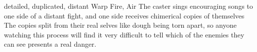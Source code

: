   {detailed, duplicated, distant}%
  {Warp}%
  {Fire, Air}%
  {}%
  {The caster sings encouraging songs to one side of a distant fight, and one side receives chimerical copies of themselves}%
  {The copies split from their real selves like dough being torn apart, so anyone watching this process will find it very difficult to tell which of the enemies they can see presents a real danger.}

